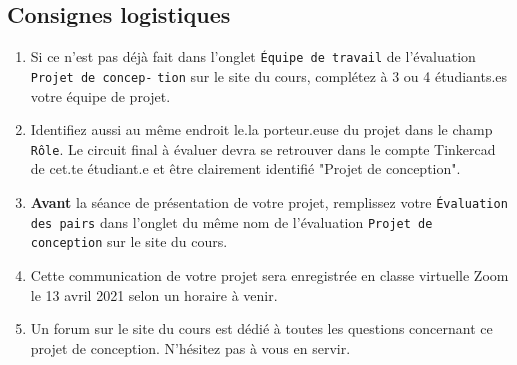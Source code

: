 \documentclass[english,french,12pt]{article}
\begin{document}
\subsection*{Consignes logistiques}
\begin{enumerate}
    \item Si ce n'est pas déjà fait dans l'onglet \texttt{Équipe de travail} de l'évaluation \texttt{Projet de concep-} \texttt{tion} sur le site du cours, complétez à 3 ou 4 étudiants.es votre équipe de projet.
    \item Identifiez aussi au même endroit le.la porteur.euse du projet dans le champ \texttt{Rôle}. Le circuit final à évaluer devra se retrouver dans le compte Tinkercad de cet.te étudiant.e et être clairement identifié "Projet de conception".
    \item \textbf{Avant} la séance de présentation de votre projet, remplissez votre \texttt{Évaluation des pairs} dans l'onglet du même nom de l'évaluation \texttt{Projet de conception} sur le site du cours.
    \item Cette communication de votre projet sera enregistrée en classe virtuelle Zoom le 13 avril 2021 selon un horaire à venir.
    \item Un forum sur le site du cours est dédié à toutes les questions concernant ce projet de conception. N’hésitez pas à vous en servir. 
\end{enumerate}
\end{document}
